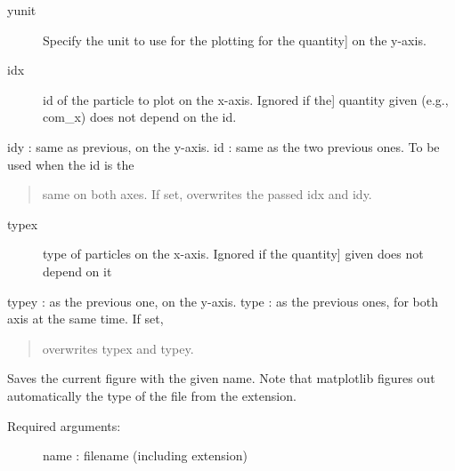 \documentclass[letterpaper,10pt,english]{sphinxmanual}
\begin{document}
\begin{fulllineitems}
\begin{description}
\begin{description}
\item[{yunit}] \leavevmode{[}Specify the unit to use for the plotting for the quantity{]}
on the y-axis.

\item[{idx}] \leavevmode{[}id of the particle to plot on the x-axis. Ignored if the{]}
quantity given (e.g., com\_x) does not depend on the id.

\end{description}

idy        : same as previous, on the y-axis.
id         : same as the two previous ones. To be used when the id is the
\begin{quote}

same on both axes. If set, overwrites the passed idx and idy.
\end{quote}
\begin{description}
\item[{typex}] \leavevmode{[}type of particles on the x-axis. Ignored if the quantity{]}
given does not depend on it

\end{description}

typey      : as the previous one, on the y-axis.
type       : as the previous ones, for both axis at the same time. If set,
\begin{quote}

overwrites typex and typey.
\end{quote}

\end{description}

\end{fulllineitems}


\begin{fulllineitems}
\label{index:facade.savefig}
Saves the current figure with the given name.  Note that matplotlib
figures out automatically the type of the file from the extension.
\begin{description}
\item[{Required arguments:}] \leavevmode
name       : filename (including extension)

\end{description}

\end{fulllineitems}

\end{document}
